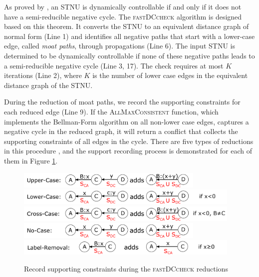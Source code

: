 \documentclass[jair,twoside,11pt,theapa]{article}
\begin{document}
As proved by , an STNU is dynamically controllable if
and only if it does not have a semi-reducible negative cycle. The
\textsc{fastDCcheck} algorithm is designed based on this theorem. It converts
the STNU to an equivalent distance graph of normal form (Line 1) and identifies
all negative paths that start with a lower-case edge, called \textit{moat
	paths}, through propagations (Line 6). The input STNU is determined to be
dynamically controllable if none of these negative paths leads to a
semi-reducible negative cycle (Line 3, 17). The check requires at most $K$
iterations (Line 2), where $K$ is the number of lower case edges in the
equivalent distance graph of the STNU.


During the reduction of moat paths, we record the supporting constraints for
each reduced edge (Line 9). If the \textsc{AllMaxConsistent} function, which
implements the Bellman-Form algorithm on all non-lower case edges, captures a
negative cycle in the reduced graph, it will return a conflict that collects the
supporting constraints of all edges in the cycle. There are five types of
reductions in this procedure \cite{Morris05temporaldynamic,Morris_astructural},
and the support recording process is demonstrated for each of them in Figure \ref{fig:DCReduction}.


\begin{figure}[ht!]
	\includegraphics[width=0.8\textwidth]{figures/DC_reductions/UpperCase.pdf}  
	\includegraphics[width=0.96\textwidth]{figures/DC_reductions/LowerCase.pdf}  
	\includegraphics[width=0.96\textwidth]{figures/DC_reductions/CrossCase.pdf}
	\includegraphics[width=0.8\textwidth]{figures/DC_reductions/NoCase.pdf}
	\includegraphics[width=0.96\textwidth]{figures/DC_reductions/LabelRemoval.pdf}
	\caption{Record supporting constraints during the \textsc{fastDCcheck} reductions}
	\label{fig:DCReduction}
\end{figure}
\end{document}
